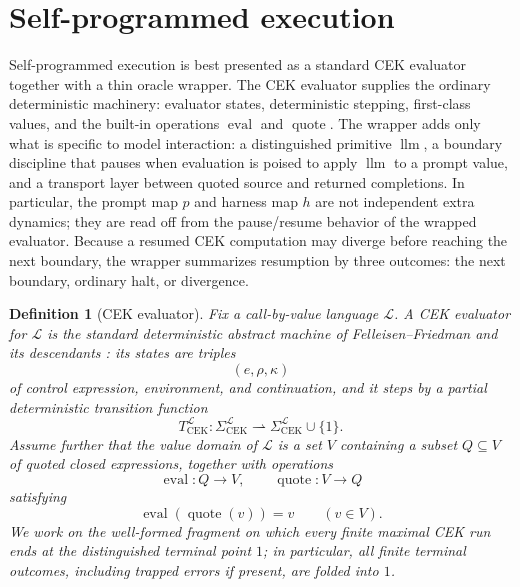 \documentclass[11pt]{article}
\newtheorem{definition}{Definition}[section]
\newcommand{\eval}{\operatorname{eval}}
\newcommand{\quoteop}{\operatorname{quote}}
\newcommand{\llm}{\operatorname{llm}}
\begin{document}
\section{Self-programmed execution}

Self-programmed execution is best presented as a standard CEK evaluator together with a thin oracle wrapper. The CEK evaluator supplies the ordinary deterministic machinery: evaluator states, deterministic stepping, first-class values, and the built-in operations $\eval$ and $\quoteop$. The wrapper adds only what is specific to model interaction: a distinguished primitive $\llm$, a boundary discipline that pauses when evaluation is poised to apply $\llm$ to a prompt value, and a transport layer between quoted source and returned completions. In particular, the prompt map $p$ and harness map $h$ are not independent extra dynamics; they are read off from the pause/resume behavior of the wrapped evaluator. Because a resumed CEK computation may diverge before reaching the next boundary, the wrapper summarizes resumption by three outcomes: the next boundary, ordinary halt, or divergence.

\begin{definition}[CEK evaluator]\label{def:cek}
Fix a call-by-value language $\mathcal{L}$. A \emph{CEK evaluator} for $\mathcal{L}$ is the standard deterministic abstract machine of Felleisen--Friedman and its descendants \cite{FelleisenFriedman86,AgerEtAl03}: its states are triples
\[
(e,\rho,\kappa)
\]
of control expression, environment, and continuation, and it steps by a partial deterministic transition function
\[
T_{\mathrm{CEK}}^{\mathcal{L}}: \Sigma_{\mathrm{CEK}}^{\mathcal{L}} \rightharpoonup \Sigma_{\mathrm{CEK}}^{\mathcal{L}}\cup\{1\}.
\]
Assume further that the value domain of $\mathcal{L}$ is a set $V$ containing a subset $Q\subseteq V$ of quoted closed expressions, together with operations
\[
\eval:Q\to V,
\qquad
\quoteop:V\to Q
\]
satisfying
\[
\eval(\quoteop(v))=v
\qquad (v\in V).
\]
We work on the well-formed fragment on which every finite maximal CEK run ends at the distinguished terminal point $1$; in particular, all finite terminal outcomes, including trapped errors if present, are folded into $1$.
\end{definition}
\end{document}
